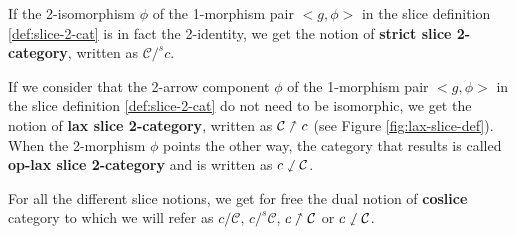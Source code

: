 \begin{defn}
    \label{def:lax-slice-2-cat}
    If the 2-isomorphism $\phi$ of the 1-morphism pair $\big<g,\phi\big>$ in the slice definition \ref{def:slice-2-cat} is in fact the 2-identity, we get the notion of \textbf{strict slice 2-category}, written as $\mathcal{C} /^s c$\label{nomencl:strict-slice}.
\end{defn}

\begin{defn}
    \label{def:lax-slice-2-cat}
    If we consider that the 2-arrow component $\phi$ of the 1-morphism pair $\big<g,\phi\big>$ in the slice definition \ref{def:slice-2-cat} do not need to be isomorphic, we get the notion of \textbf{lax slice 2-category}, written as $\mathcal{C}\nnearrow c$\label{nomencl:lax-slice}
    (see Figure \ref{fig:lax-slice-def}). When the 2-morphism $\phi$ points the other way, the category that results is called \textbf{op-lax slice 2-category} and is written as $c\sswarrow\mathcal{C}$\label{nomencl:oplax-slice}.
\end{defn}

\begin{rem}
    For all the different slice notions, we get for free the dual notion of \textbf{coslice} category to which we will refer as $c/\mathcal{C}$\label{nomencl:coslice}, $c/^s\mathcal{C}$\label{nomencl:coslice}, $c\nnearrow\mathcal{C}$\label{nomencl:lax-coslice} or $c\sswarrow\mathcal{C}$\label{nomencl:oplax-coslice}.
\end{rem}


